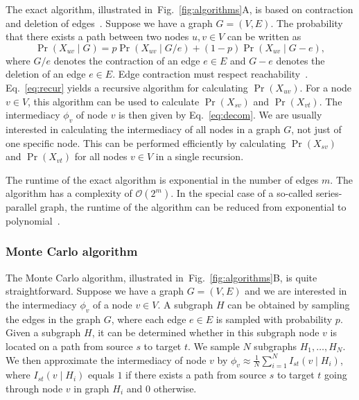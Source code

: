 \documentclass[9pt,twocolumn,twoside]{pnas-alt} %
\theoremstyle{definition}
\newcommand{\subfigref}[2]{Fig.~\ref{fig:#1}#2\xspace}
\renewcommand{\eqref}[1]{Eq.~\ref{eq:#1}\xspace}
\renewcommand{\O}{\mathcal{O}}
\begin{document}
{The exact algorithm, illustrated in~\subfigref{algorithms}{A}, is based on contraction and deletion of edges~\cite{Moskowitz1958}. Suppose we have a graph $G = (V, E)$. The probability that there exists a path between two nodes $u, v \in V$ can be written as
\begin{equation}
    \Pr(X_{uv} \mid G) = p\Pr(X_{uv} \mid G / e) + (1 - p)\Pr(X_{uv} \mid G - e),
    \label{eq:recur}
\end{equation}
where $G / e$ denotes the contraction of an edge $e \in E$ and $G - e$ denotes the deletion of an edge $e \in E$. Edge contraction must respect reachability~\cite{Page1989}. \eqref{recur} yields a recursive algorithm for calculating $\Pr(X_{uv})$. For a node $v \in V$, this algorithm can be used to calculate $\Pr(X_{sv})$ and $\Pr(X_{vt})$. The intermediacy $\phi_v$ of node $v$ is then given by \eqref{decom}. We are usually interested in calculating the intermediacy of all nodes in a graph $G$, not just of one specific node. This can be performed efficiently by calculating $\Pr(X_{sv})$ and $\Pr(X_{vt})$ for all nodes $v \in V$ in a single recursion.

The runtime of the exact algorithm is exponential in the number of edges $m$. The algorithm has a complexity of $\O(2^m)$. In the special case of a so-called series-parallel graph, the runtime of the algorithm can be reduced from exponential to polynomial~\cite{Misra1970}.

\subsubsection*{\label{sec:montecarlo}Monte Carlo algorithm}

The Monte Carlo algorithm, illustrated in~\subfigref{algorithms}{B}, is quite straightforward. Suppose we have a graph $G = (V, E)$ and we are interested in the intermediacy $\phi_v$ of a node $v \in V$. A subgraph $H$ can be obtained by sampling the edges in the graph $G$, where each edge $e \in E$ is sampled with probability $p$. Given a subgraph $H$, it can be determined whether in this subgraph node $v$ is located on a path from source $s$ to target $t$. We sample $N$ subgraphs $H_1, \ldots, H_N$. We then approximate the intermediacy of node $v$ by $\phi_v \approx \frac{1}{N}\sum_{i = 1}^N I_{st}(v \mid H_i)$, where $I_{st}(v \mid H_i)$ equals $1$ if there exists a path from source $s$ to target $t$ going through node $v$ in graph $H_i$ and $0$ otherwise.

}
\end{document}
